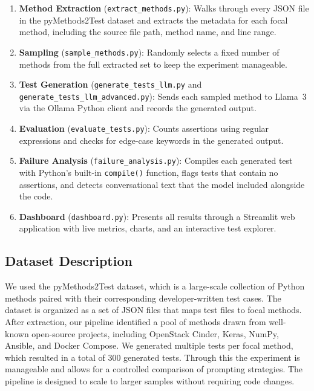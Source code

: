 \documentclass[conference]{IEEEtran}
\begin{document}
\begin{enumerate}[leftmargin=*]
    \item \textbf{Method Extraction} (\texttt{extract\_methods.py}): Walks through every JSON file in the pyMethods2Test dataset and extracts the metadata for each focal method, including the source file path, method name, and line range.
    \item \textbf{Sampling} (\texttt{sample\_methods.py}): Randomly selects a fixed number of methods from the full extracted set to keep the experiment manageable.
    \item \textbf{Test Generation} (\texttt{generate\_tests\_llm.py} and \texttt{generate\_tests\_llm\_advanced.py}): Sends each sampled method to Llama~3 via the Ollama Python client and records the generated output.
    \item \textbf{Evaluation} (\texttt{evaluate\_tests.py}): Counts assertions using regular expressions and checks for edge-case keywords in the generated output.
    \item \textbf{Failure Analysis} (\texttt{failure\_analysis.py}): Compiles each generated test with Python's built-in \texttt{compile()} function, flags tests that contain no assertions, and detects conversational text that the model included alongside the code.
    \item \textbf{Dashboard} (\texttt{dashboard.py}): Presents all results through a Streamlit web application with live metrics, charts, and an interactive test explorer.
\end{enumerate}

\subsection{Dataset Description}

We used the pyMethods2Test dataset, which is a large-scale collection of Python methods paired with their corresponding developer-written test cases. The dataset is organized as a set of JSON files that maps test files to focal methods. After extraction, our pipeline identified a pool of methods drawn from well-known open-source projects, including OpenStack Cinder, Keras, NumPy, Ansible, and Docker Compose. We generated multiple tests per focal method, which resulted in a total of 300 generated tests. Through this the experiment is manageable and allows for a controlled comparison of prompting strategies. The pipeline is designed to scale to larger samples without requiring code changes.
\end{document}
